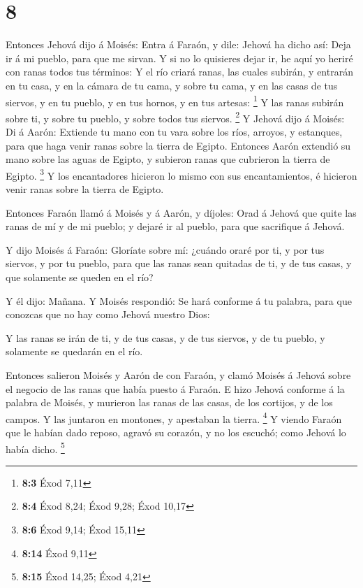\hypertarget{section-7}{%
\section{8}\label{section-7}}

 Entonces Jehová dijo á Moisés: Entra á Faraón, y dile:
Jehová ha dicho así: Deja ir á mi pueblo, para que me sirvan.
 Y si no lo quisieres dejar ir, he aquí yo heriré con ranas
todos tus términos:  Y el río criará ranas, las cuales
subirán, y entrarán en tu casa, y en la cámara de tu cama, y sobre tu
cama, y en las casas de tus siervos, y en tu pueblo, y en tus hornos, y
en tus artesas: \footnote{\textbf{8:3} Éxod 7,11}  Y las
ranas subirán sobre ti, y sobre tu pueblo, y sobre todos tus siervos.
\footnote{\textbf{8:4} Éxod 8,24; Éxod 9,28; Éxod 10,17}  Y
Jehová dijo á Moisés: Di á Aarón: Extiende tu mano con tu vara sobre los
ríos, arroyos, y estanques, para que haga venir ranas sobre la tierra de
Egipto.  Entonces Aarón extendió su mano sobre las aguas de
Egipto, y subieron ranas que cubrieron la tierra de Egipto. \footnote{\textbf{8:6}
  Éxod 9,14; Éxod 15,11}  Y los encantadores hicieron lo
mismo con sus encantamientos, é hicieron venir ranas sobre la tierra de
Egipto.

 Entonces Faraón llamó á Moisés y á Aarón, y díjoles: Orad á
Jehová que quite las ranas de mí y de mi pueblo; y dejaré ir al pueblo,
para que sacrifique á Jehová.

 Y dijo Moisés á Faraón: Gloríate sobre mí: ¿cuándo oraré
por ti, y por tus siervos, y por tu pueblo, para que las ranas sean
quitadas de ti, y de tus casas, y que solamente se queden en el río?

 Y él dijo: Mañana. Y Moisés respondió: Se hará conforme á
tu palabra, para que conozcas que no hay como Jehová nuestro Dios:

 Y las ranas se irán de ti, y de tus casas, y de tus
siervos, y de tu pueblo, y solamente se quedarán en el río.

 Entonces salieron Moisés y Aarón de con Faraón, y clamó
Moisés á Jehová sobre el negocio de las ranas que había puesto á Faraón.
 E hizo Jehová conforme á la palabra de Moisés, y murieron
las ranas de las casas, de los cortijos, y de los campos. 
Y las juntaron en montones, y apestaban la tierra. \footnote{\textbf{8:14}
  Éxod 9,11}  Y viendo Faraón que le habían dado reposo,
agravó su corazón, y no los escuchó; como Jehová lo había dicho.
\footnote{\textbf{8:15} Éxod 14,25; Éxod 4,21}

